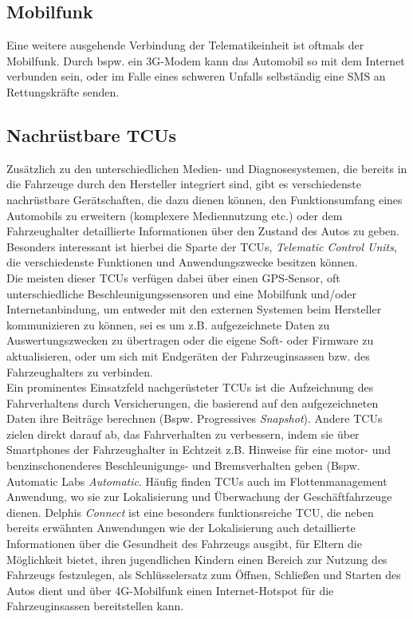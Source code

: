 \documentclass[
    fontsize=12pt,
    headings=small,
    parskip=half,           %
    bibliography=totoc,9
    numbers=noenddot,       %
    open=any,               %
    ]{scrreprt}
\begin{document}
\subsection{Mobilfunk}
Eine weitere ausgehende Verbindung der Telematikeinheit ist oftmals der Mobilfunk. Durch bspw. ein 3G-Modem kann das Automobil so mit dem Internet verbunden sein, oder im Falle eines schweren Unfalls selbständig eine SMS an Rettungskräfte senden.
\subsection{Nachrüstbare TCUs}
Zusätzlich zu den unterschiedlichen Medien- und Diagnosesystemen, die bereits in die Fahrzeuge durch den Hersteller integriert sind, gibt es verschiedenste nachrüstbare Gerätschaften, die dazu dienen können, den Funktionsumfang eines Automobils zu erweitern (komplexere Mediennutzung etc.) oder dem Fahrzeughalter detaillierte Informationen über den Zustand des Autos zu geben. Besonders interessant ist hierbei die Sparte der TCUs, \textit{Telematic Control Units}, die verschiedenste Funktionen und Anwendungszwecke besitzen können. \\
Die meisten dieser TCUs verfügen dabei über einen GPS-Sensor, oft unterschiedliche Beschleunigungssensoren und eine Mobilfunk und/oder Internetanbindung, um entweder mit den externen Systemen beim Hersteller kommunizieren zu können, sei es um z.B. aufgezeichnete Daten zu Auswertungszwecken zu übertragen oder die eigene Soft- oder Firmware zu aktualisieren, oder um sich mit Endgeräten der Fahrzeuginsassen bzw. des Fahrzeughalters zu verbinden. \\
Ein prominentes Einsatzfeld nachgerüsteter TCUs ist die Aufzeichnung des Fahrverhaltens durch Versicherungen, die basierend auf den aufgezeichneten Daten ihre Beiträge berechnen (Bspw. Progressives \textit{Snapshot}). Andere TCUs zielen direkt darauf ab, das Fahrverhalten zu verbessern, indem sie über Smartphones der Fahrzeughalter in Echtzeit z.B. Hinweise für eine motor- und benzinschonenderes Beschleunigungs- und Bremsverhalten geben (Bspw. Automatic Labs \textit{Automatic}.
Häufig finden TCUs auch im Flottenmanagement Anwendung, wo sie zur Lokalisierung und Überwachung der Geschäftfahrzeuge dienen. Delphis \textit{Connect} ist eine besonders funktionsreiche TCU, die neben bereits erwähnten Anwendungen wie der Lokalisierung auch detaillierte Informationen über die Gesundheit des Fahrzeugs ausgibt, für Eltern die Möglichkeit bietet, ihren jugendlichen Kindern einen Bereich zur Nutzung des Fahrzeugs festzulegen, als Schlüsselersatz zum Öffnen, Schließen und Starten des Autos dient und über 4G-Mobilfunk einen Internet-Hotspot für die Fahrzeuginsassen bereitstellen kann. \\
\end{document}
